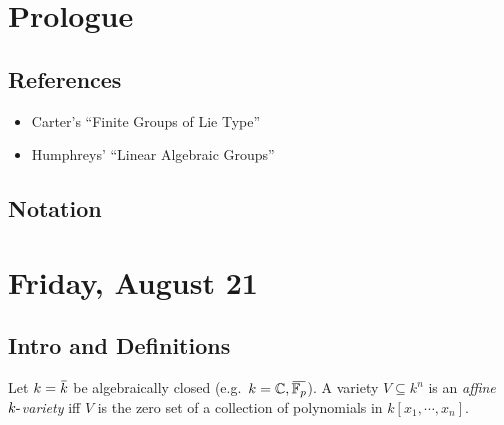 \DeclareMathOperator{\righttriplearrows} {{\; \tikz{ \foreach \y in {0, 0.1, 0.2} { \draw [-stealth] (0, \y) -- +(0.5, 0);}} \; }}

\renewcommand{\labelitemiii}{$\diamondsuit$}
\renewcommand{\labelitemiv}{$\diamondsuit$}

\hypertarget{prologue}{%
\section*{Prologue}\label{prologue}}

\hypertarget{references}{%
\subsection{References}\label{references}}

\begin{itemize}
\item
  Carter's ``Finite Groups of Lie Type''\autocite{carter_1985}
\item
  Humphreys' ``Linear Algebraic Groups''\autocite{humphreys_2004}
\end{itemize}

\hypertarget{notation}{%
\subsection{Notation}\label{notation}}


\newpage

\hypertarget{friday-august-21}{%
\section{Friday, August 21}\label{friday-august-21}}

\hypertarget{intro-and-definitions}{%
\subsection{Intro and Definitions}\label{intro-and-definitions}}

\begin{definition}

\begin{definition}

Let \(k=\mkern 1.5mu\overline{\mkern-1.5muk\mkern-1.5mu}\mkern 1.5mu\)
be algebraically closed
(e.g.~\(k = {\mathbb{C}}, \mkern 1.5mu\overline{\mkern-1.5mu{\mathbb{F}}_p\mkern-1.5mu}\mkern 1.5mu\)).
A variety \(V\subseteq k^n\) is an \emph{affine \(k{\hbox{-}}\)variety}
iff \(V\) is the zero set of a collection of polynomials in
\(k[x_1, \cdots, x_n]\).

\end{definition}

\end{definition}

